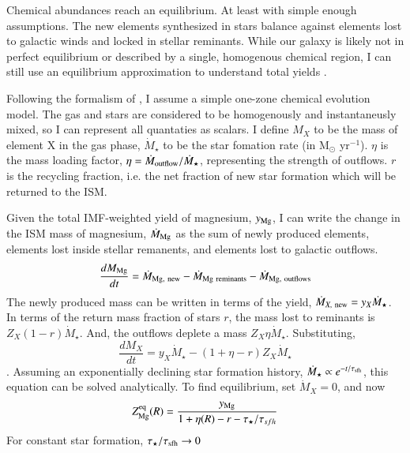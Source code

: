 \documentclass[12pt,oneside]{report}
\begin{document}
Chemical abundances reach an equilibrium. At least with simple enough assumptions. The new elements synthesized in stars balance against elements lost to galactic winds and locked in stellar reminants. While our galaxy is likely not in perfect equilibrium or described by a single, homogenous chemical region, I can still use an equilibrium approximation to understand total yields \citep[e.g.][]{james_dwarf,james+22,WAF17}. 

Following the formalism of \citet{WAF17}, I assume a simple one-zone chemical evolution model. The gas and stars are considered to be homogenously and instantaneusly mixed, so I can represent all quantaties as scalars.
I define $M_{X}$ to be the mass of element X in the gas phase, $\dot{M}_\star$ to be the star fomation rate (in M$_\odot$ yr$^{-1}$). $\eta$ is the mass loading factor, $\eta=\dot{M}_{\rm outflow}/\dot{M}_\star$, representing the strength of outflows. $r$ is the recycling fraction, i.e. the net fraction of new star formation which will be returned to the ISM. 

Given the total IMF-weighted yield of magnesium, $y_{\rm Mg}$, I can write the change in the ISM mass of magnesium, $\dot{M}_{\rm Mg}$ as the sum of newly produced elements, elements lost inside stellar remanents, and elements lost to galactic outflows.
\begin{equation}
    \frac{d{M}_{\rm Mg}}{dt} = \dot{M}_{\rm Mg,~new} - \dot{M}_{\rm Mg~reminants} - \dot{M}_{\rm Mg,~outflows}
\end{equation}
The newly produced mass can be written in terms of the yield, $\dot{M}_{X,\rm~new}=y_X\dot{M}_\star$. In terms of the return mass fraction of stars $r$, the mass lost to reminants is $Z_X (1-r)\dot{M}_\star$.  And, the outflows deplete a mass $Z_X \eta\dot{M}_\star$. Substituting, 
\begin{equation}
    \frac{d{M}_{X}}{dt} = y_{X} \dot{M}_\star - (1 + \eta - r) Z_{X} \dot{M}_\star
\end{equation}
\citep{WAF17}.
Assuming an exponentially declining star formation history, $\dot{M}_\star \propto e^{-t/\tau_{\rm sfh}}$, this equation can be solved analytically. 
To find equilibrium, set $\dot{M}_X=0$, and now
\begin{equation}\label{eq:z_eq}
    Z_{\rm Mg}^{\rm eq}(R) = \frac{y_{\rm Mg}}{1 + \eta(R) - r - \tau_\star / \tau_{sfh}}
\end{equation}
For constant star formation, $\tau_\star/\tau_{\rm sfh} \rightarrow 0$
\end{document}

